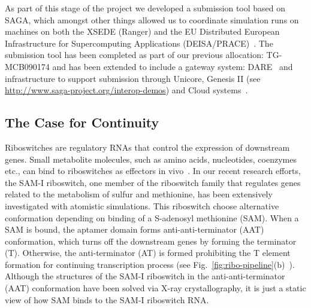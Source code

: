 \documentclass[a4paper,11pt]{article}
\newcommand{\yyenote}[1]{ {\textcolor{green} { ***YYE: #1 }}}
\newcommand{\yyenote}[1]{ {}}
\begin{document}
As part of this stage of the project we developed a submission tool based on SAGA, which amongst other things allowed us to coordinate simulation runs on machines on both the XSEDE (Ranger) and the EU Distributed European Infrastructure for Supercomputing Applications (DEISA/PRACE)~\cite{DEISA-PRACE}. The submission tool has been completed as part of our previous allocation: TG-MCB090174 and has been extended to include a gateway system: DARE~\cite{dare-tg11} and infrastructure to support submission through Unicore, Genesis II (see \url{http://www.saga-project.org/interop-demos}) and Cloud systems~\cite{pstar11}.



\subsection{The Case for Continuity}

Riboswitches are regulatory RNAs that control the expression of downstream genes. Small metabolite molecules, such as amino acids, nucleotides, coenzymes etc., can bind to riboswitches as effectors in vivo~\cite{mandal}.  In our recent research efforts, the SAM-I riboswitch, one member of the riboswitch family that regulates genes related to the metabolism of sulfur and methionine, has been extensively investigated with atomistic simulations.  This riboswitch choose alternative conformation depending on binding of a S-adenosyl methionine (SAM).  When a SAM is bound, the aptamer domain forms anti-anti-terminator (AAT) conformation, which turns off the downstream genes by forming the terminator (T). Otherwise, the anti-terminator (AT) is formed prohibiting the T element formation for continuing transcription process (see Fig.~\ref{fig:ribo-pipeline}(b)~\cite{brooke}).  Although the structures of the SAM-I riboswitch in the anti-anti-terminator (AAT) conformation have been solved via X-ray crystallography, it is just a static view of how SAM binds to the SAM-I riboswitch RNA.
\end{document}
